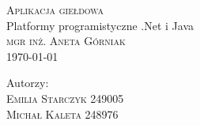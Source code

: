 \documentclass{article}
\begin{document}
\begin{titlepage}
   \vspace*{80mm}
   \centering
   \noindent\makebox[\linewidth]{\rule{\paperwidth}{0.4pt}}
   \LARGE{\textsc{Aplikacja giełdowa}\\}
   Platformy programistyczne .Net i Java\\
   \textsc{\large mgr inż. Aneta Górniak\\}
   \large \today \\
   \noindent\makebox[\linewidth]{\rule{\paperwidth}{0.4pt}}
   \begin{minipage}[l]{0.3\textwidth}
      \vspace{0.4cm}
      Autorzy:\\
      \textsc{\large Emilia Starczyk} 249005\\
      \textsc{\large Michał Kaleta} 248976\\
   \end{minipage}

   \vfill
\end{titlepage}
\end{document}
